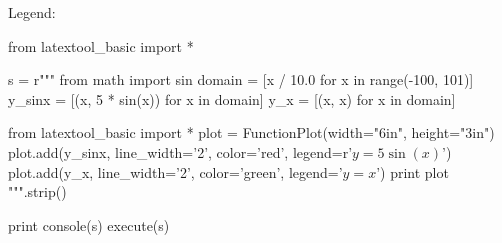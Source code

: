 Legend:
\begin{python}
from latextool_basic import *

s = r"""
from math import sin
domain = [x / 10.0 for x in range(-100, 101)]
y_sinx = [(x, 5 * sin(x)) for x in domain]
y_x = [(x, x) for x in domain]

from latextool_basic import *
plot = FunctionPlot(width="6in", height="3in")
plot.add(y_sinx, line_width='2', color='red', legend=r'$y = 5 \sin(x)$')
plot.add(y_x, line_width='2', color='green', legend='$y = x$')
print plot
""".strip()

print console(s)
execute(s)
\end{python}
